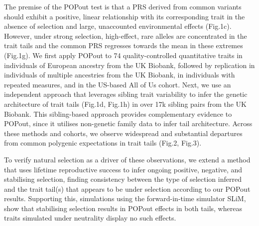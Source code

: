 \documentclass[12pt]{zHenriquesLab-StyleBioRxiv}
\begin{document}
{\color{red}{In this study, we develop population-based and family-based methods to interrogate the tail architecture of complex traits, we investigate the role of selection in shaping this architecture, and we consider the implications of our observations on PRS accuracy and rare-variant discovery. First, we introduce the PRS-On-Phenotype outlier (“POPout”) test, a novel method that uses PRS to detect deviations in common polygenic expectations in the tails of trait distributions (e.g. in the lowest and highest 1\% of LDL, BMI, glucose).}} The premise of the POPout test is that a PRS derived from common variants should exhibit a positive, linear relationship with its corresponding trait in the absence of selection and large, unaccounted environmental effects (Fig.1c). However, under strong selection, high-effect, rare alleles are concentrated in the trait tails and the common PRS regresses towards the mean in these extremes (Fig.1g). We first apply POPout to 74 quality-controlled quantitative traits in individuals of European ancestry from the UK Biobank, followed by replication in individuals of multiple ancestries from the UK Biobank, in individuals with repeated measures, and in the US-based All of Us cohort. Next, we use an independent approach that leverages sibling trait variability to infer the genetic architecture of trait tails (Fig.1d, Fig.1h) in over 17k sibling pairs from the UK Biobank. This sibling-based approach provides complementary evidence to POPout, since it utilises non-genetic family data to infer tail architecture. Across these methods and cohorts, we observe widespread and substantial departures from common polygenic expectations in trait tails (Fig.2, Fig.3). {\color{red}{We find direct evidence for the role of rare variants in these departures from common polygenicity using published exome study results and by incorporation of rare variants – identified through our own whole genome sequence study analyses – into the PRSs.} To verify natural selection as a driver of these observations, we extend a method that uses lifetime reproductive success to infer ongoing positive, negative, and stabilising selection, finding consistency between the type of selection inferred and the trait tail(s) that appears to be under selection according to our POPout results. Supporting this, simulations using the forward-in-time simulator SLiM, show that stabilising selection results in POPout effects in both tails, whereas traits simulated under neutrality display no such effects. {\color{red}{Our findings highlight the distinct nature of genetic architecture in the tails of complex traits, emphasize the role of selection in the causes of phenotypic extremes, and imply strategies for increasing the accuracy of genetic prediction of complex traits and disease.}} 


}
\end{document}
